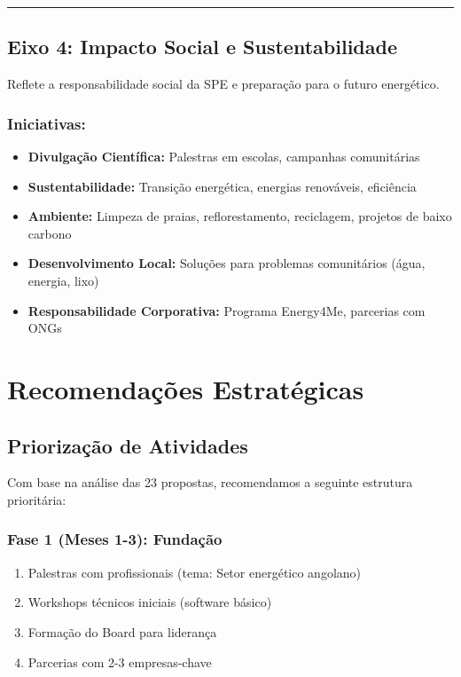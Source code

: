 \documentclass[12pt,a4paper]{article}
\begin{document}
\textcolor{spe-secondary}{\hspace{0.5cm}\rule{0.4\linewidth}{0.8pt}}
\subsection{Eixo 4: Impacto Social e Sustentabilidade}

Reflete a responsabilidade social da SPE e preparação para o futuro energético.

\subsubsection*{Iniciativas:}
\begin{itemize}[itemsep=0.2cm]
    \item \textbf{Divulgação Científica:} Palestras em escolas, campanhas comunitárias
    \item \textbf{Sustentabilidade:} Transição energética, energias renováveis, eficiência
    \item \textbf{Ambiente:} Limpeza de praias, reflorestamento, reciclagem, projetos de baixo carbono
    \item \textbf{Desenvolvimento Local:} Soluções para problemas comunitários (água, energia, lixo)
    \item \textbf{Responsabilidade Corporativa:} Programa Energy4Me, parcerias com ONGs
\end{itemize}

\newpage


\newpage
\section{Recomendações Estratégicas}

\subsection{Priorização de Atividades}

Com base na análise das 23 propostas, recomendamos a seguinte estrutura prioritária:

\subsubsection*{Fase 1 (Meses 1-3): Fundação}
\begin{enumerate}[itemsep=0.2cm]
    \item Palestras com profissionais (tema: Setor energético angolano)
    \item Workshops técnicos iniciais (software básico)
    \item Formação do Board para liderança
    \item Parcerias com 2-3 empresas-chave
\end{enumerate}
\end{document}
